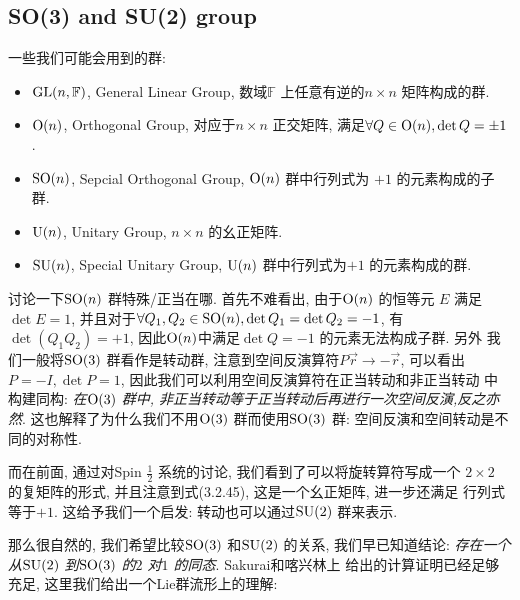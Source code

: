 \subsection{SO(3) and SU(2) group}

一些我们可能会用到的群:

\begin{itemize}
  \item ${\rm GL}(n, \mathbb{F})$, General Linear Group, 数域$\mathbb{F}$ 上任意有逆的$n\times n$ 矩阵构成的群.
  \item ${\rm O}(n)$, Orthogonal Group, 对应于$n\times n$ 正交矩阵, 满足$\forall Q\in {\rm O}(n), \det Q = \pm 1$.
  \item ${\rm SO}(n)$, Sepcial Orthogonal Group, ${\rm O}(n)$ 群中行列式为 $+1$ 的元素构成的子群.
  \item ${\rm U}(n)$, Unitary Group, $n\times n$ 的幺正矩阵.
  \item ${\rm SU}(n)$, Special Unitary Group, ${\rm U}(n)$ 群中行列式为$+1$ 的元素构成的群.
\end{itemize}

\begin{remark}
  讨论一下${\rm SO}(n)$ 群特殊/正当在哪. 首先不难看出, 由于${\rm O}(n)$ 的恒等元 $E$ 满足
  $\det E = 1$,  并且对于$\forall Q_1, Q_2\in {\rm SO}(n), \det Q_1 = \det Q_2 = -1$,
  有$\det(Q_1 Q_2) = +1$, 因此${\rm O}(n)$中满足$\det Q=-1$ 的元素无法构成子群. 另外
  我们一般将${\rm SO}(3)$ 群看作是转动群, 注意到空间反演算符$P \vec{r} \to -\vec{r}$,
  可以看出$P = -I, \det P = 1$, 因此我们可以利用空间反演算符在正当转动和非正当转动
  中构建同构: \emph{在${\rm O}(3)$ 群中, 非正当转动等于正当转动后再进行一次空间反演,反之亦然}.
  这也解释了为什么我们不用${\rm O}(3)$ 群而使用${\rm SO}(3)$ 群: 空间反演和空间转动是不同的对称性.
\end{remark}

而在前面, 通过对Spin $\frac{1}{2}$ 系统的讨论, 我们看到了可以将旋转算符写成一个
$2\times 2$ 的复矩阵的形式, 并且注意到式(3.2.45), 这是一个幺正矩阵, 进一步还满足
行列式等于$+1$. 这给予我们一个启发: 转动也可以通过${\rm SU}(2)$ 群来表示.

那么很自然的, 我们希望比较${\rm SO}(3)$ 和${\rm SU}(2)$ 的关系, 我们早已知道结论:
\emph{存在一个从${\rm SU}(2)$ 到${\rm SO}(3)$ 的$2$ 对$1$ 的同态}. Sakurai和喀兴林上
给出的计算证明已经足够充足, 这里我们给出一个Lie群流形上的理解:

